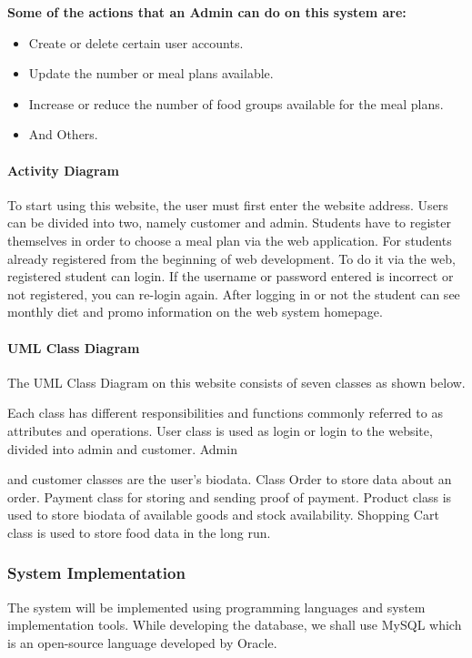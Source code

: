 \documentclass{article}
\begin{document}
\textbf{Some of the actions that an Admin can do on this system are:}
\begin{itemize}
\item Create or delete certain user accounts.
\item Update the number or meal plans available.
\item Increase or reduce the number of food groups available for the meal plans.
\item And Others.
\end{itemize}

\paragraph{Activity Diagram \\}
To start using this website, the user must first enter the website address. Users can be divided into two, namely customer and admin.  Students have to register themselves in order to choose a meal plan via the web application. For students already registered from the beginning of web development. To do it via the web, registered student can login. If the username or password entered is incorrect or not registered, you can re-login again. After logging in or not the student can see monthly diet and promo information on the web system homepage.

\paragraph{UML Class Diagram \\}
The UML Class Diagram on this website consists of seven classes as shown below.

Each class has different responsibilities and functions commonly referred to as attributes and operations. User class is used as login or login to the website, divided into admin and customer. Admin

and customer classes are the user’s biodata. Class Order to store data about an order. Payment class for storing and sending proof of payment. Product class is used to store biodata of available goods and stock availability. Shopping Cart class is used to store food data in the long run.

\subsubsection{System Implementation}
The system will be implemented using programming languages and system implementation tools. While developing the database, we shall use MySQL which is an open-source language developed by Oracle.  
\end{document}
